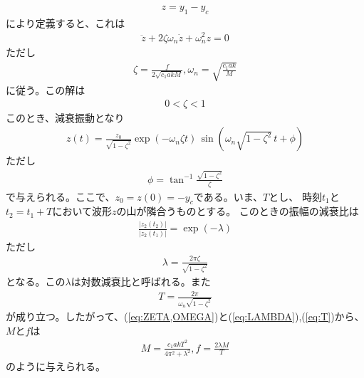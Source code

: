 \documentclass[a4j,11pt,twoside]{ujbook}
\begin{document}
	\begin{eqnarray*}
		z = y_1 - y_c
	\end{eqnarray*}
	により定義すると、これは
	\begin{eqnarray*}
		\ddot{z} + 2\zeta\omega_n\dot{z} + \omega_n^2z = 0
	\end{eqnarray*}
	ただし
	\begin{eqnarray}
		\zeta = \frac{f}{2\sqrt{c_1akM}} , \omega_n = \sqrt{\frac{c_1ak}{M}}
		\label{eq:ZETA,OMEGA}
	\end{eqnarray}
	に従う。この解は
	\begin{eqnarray*}
		0 < \zeta < 1
	\end{eqnarray*}
	このとき、減衰振動となり
	\begin{eqnarray*}
		z(t) = \frac{z_0}{\sqrt{1-\zeta^2}}\exp(-\omega_n\zeta
		t)\,\sin(\omega_n\sqrt{1-\zeta^2}\,t+\phi)
	\end{eqnarray*}
	ただし
	\begin{eqnarray*}
		\phi = \tan^{-1}{\frac{\sqrt{1-\zeta^2}}{\zeta}}
	\end{eqnarray*}
	で与えられる。ここで、$z_0 = z(0) = -y_c$である。いま、$T$とし、
	時刻$t_1$と$t_2 = t_1 + T$において波形$z$の山が隣合うものとする。
	このときの振幅の減衰比は
	\begin{eqnarray*}
		\frac{|z_2(t_2)|}{|z_2(t_1)|} = \exp(-\lambda)
	\end{eqnarray*}
	ただし
	\begin{eqnarray}
		\lambda = \frac{2\pi\zeta}{\sqrt{1-\zeta^2}}
		\label{eq:LAMBDA}
	\end{eqnarray}
	となる。この$\lambda$は対数減衰比と呼ばれる。また
	\begin{eqnarray}
		T = \frac{2\pi}{\omega_n\sqrt{1-\zeta^2}}
		\label{eq:T}
	\end{eqnarray}
	が成り立つ。したがって、(\ref{eq:ZETA,OMEGA})と(\ref{eq:LAMBDA}),(\ref{eq:T})から、$M$と$f$は
	\begin{eqnarray}
		M = \frac{c_1akT^2}{4\pi^2 + \lambda^2},f = \frac{2\lambda M}{T}
		\label{M,f}
	\end{eqnarray}
	のように与えられる。
\end{document}
